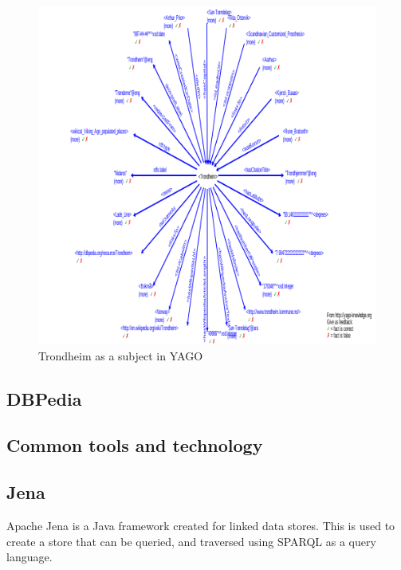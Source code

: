 \begin{figure}[t]
  \centering
  \includegraphics[scale=0.3]{fig/yago_trondheim.png}
 \caption{Trondheim as a subject in YAGO}
 \label{fig:1}
\end{figure}


\subsection{DBPedia}

\subsection{Common tools and technology}


\subsection{Jena}
Apache Jena is a Java framework created for linked data stores. This is used to create a store that can be queried, and traversed using SPARQL as a query language.  \\




